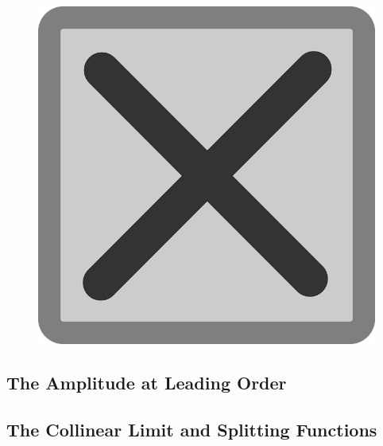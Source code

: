 \begin{figure}[t!]
    \centering
    \includegraphics[width=\textwidth]{figures/tempfig}

    \caption{
    }

    \label{fig:decay}
\end{figure}

\subsection{The Amplitude at Leading Order}

\subsection{The Collinear Limit and Splitting Functions}



